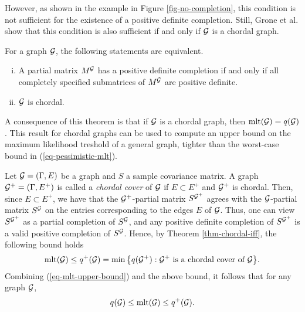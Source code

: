 

However, as shown in the example in Figure \ref{fig-no-completion}, this condition is not sufficient for the existence of a positive definite completion. Still, Grone et al. \cite{GRONE1984109} show that this condition is also sufficient if and only if ${\mathcal{G}}$ is a chordal graph.
\begin{theorem} \label{thm-chordal-iff}
    For a graph ${\mathcal{G}}$, the following statements are equivalent.
    \begin{enumerate}[i.]
        \item A partial matrix $M^{\mathcal{G}}$ has a positive definite completion if and only if all completely specified submatrices of $M^{\mathcal{G}}$ are positive definite.
        \item ${\mathcal{G}}$ is chordal.
    \end{enumerate}
\end{theorem}
A consequence of this theorem is that if ${\mathcal{G}}$ is a chordal graph, then ${\textrm{mlt}}({\mathcal{G}}) = q({\mathcal{G}})$. This result for chordal graphs can be used to compute an upper bound on the maximum likelihood treshold of a general graph, tighter than the worst-case bound in (\ref{eq-pessimistic-mlt}). 

Let ${\mathcal{G}} = (\Gamma, E)$ be a graph and $S$ a sample covariance matrix. A graph ${\mathcal{G}}^+ = (\Gamma, E^+)$ is called a \textit{chordal cover} of ${\mathcal{G}}$ if $E \subset E^+$ and ${\mathcal{G}}^+$ is chordal. Then, since $E \subset E^+$, we have that the ${\mathcal{G}}^+$-partial matrix $S^{{\mathcal{G}}^+}$ agrees with the ${\mathcal{G}}$-partial matrix $S^{\mathcal{G}}$ on the entries corresponding to the edges $E$ of ${\mathcal{G}}$. Thus, one can view $S^{{\mathcal{G}}^+}$ as a partial completion of $S^{\mathcal{G}}$, and any positive definite completion of $S^{{\mathcal{G}}^+}$ is a valid positive completion of $S^{\mathcal{G}}$. Hence, by Theorem \ref{thm-chordal-iff}, the following bound holds
\begin{equation*}
    {\textrm{mlt}}({\mathcal{G}}) \leq q^+({\mathcal{G}}) = \min {\left\{ q({\mathcal{G}}^+) : {\mathcal{G}}^+ {\textrm{ is a chordal cover of }} {\mathcal{G}}\right\}}.
\end{equation*}
Combining (\ref{eq-mlt-upper-bound}) and the above bound, it follows that for any graph ${\mathcal{G}}$,
\begin{equation} \label{eq-mlt-bounds}
    q({\mathcal{G}}) \leq {\textrm{mlt}}({\mathcal{G}}) \leq q^+({\mathcal{G}}).
\end{equation}



